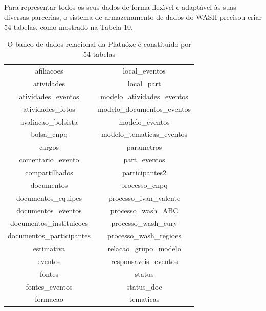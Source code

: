 \documentclass[
12pt,		%
openright,	%
twoside,  %
a4paper,			%
chapter=TITLE,		%
english,			%
french,				%
spanish,			%
brazil				%
]{USPSC-classe/USPSC}
\begin{document}
Para representar todos os seus dados de forma flex\'{\i}vel e adapt\'avel \`as suas diversas parcerias, o sistema de armazenamento de dados do WASH precisou criar 54 tabelas, como mostrado na Tabela 10.













\begin{table}[htb]
\tiny
\caption{\label{5b2e4ba8f3836249e7dd88b37344da7bfa3669c5}O banco de dados relacional da Platu\'oxe \'e constitu\'{i}do por 54 tabelas}

\centering
\begin{tabular}{|c|c|}
\hline
afiliacoes                     &   local\_eventos \\
 atividades                     &   local\_part \\
 atividades\_eventos             &   modelo\_atividades\_eventos \\
 atividades\_fotos               &   modelo\_documentos\_eventos \\
 avaliacao\_bolsista             &   modelo\_eventos \\
 bolsa\_cnpq                     &   modelo\_tematicas\_eventos \\
 cargos                         &   parametros \\
 comentario\_evento              &   part\_eventos \\
 compartilhados                 &   participantes2 \\
 documentos                     &   processo\_cnpq \\
 documentos\_equipes             &   processo\_ivan\_valente \\
 documentos\_eventos             &   processo\_wash\_ABC \\
 documentos\_instituicoes        &   processo\_wash\_cury \\
 documentos\_participantes       &   processo\_wash\_regioes \\
 estimativa                     &   relacao\_grupo\_modelo \\
 eventos                        &   responsaveis\_eventos \\
 fontes                         &   status \\
 fontes\_eventos                 &   status\_doc \\
 formacao                       &   tematicas \\

\end{tabular}
\end{table}
\end{document}
